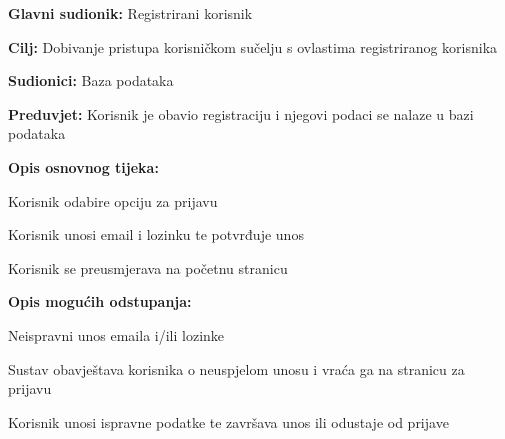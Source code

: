 \noindent {}
\begin{packed_item}

	\item \textbf{Glavni sudionik: }Registrirani korisnik
	\item  \textbf{Cilj:} Dobivanje pristupa korisničkom sučelju s ovlastima registriranog korisnika
	\item  \textbf{Sudionici:} Baza podataka
	\item  \textbf{Preduvjet:} Korisnik je obavio registraciju i njegovi podaci se nalaze u bazi podataka
	\item  \textbf{Opis osnovnog tijeka:}

	\item[] \begin{packed_enum}

		\item Korisnik odabire opciju za prijavu
		\item Korisnik unosi email i lozinku te potvrđuje unos
		\item Korisnik se preusmjerava na početnu stranicu
	\end{packed_enum}

	\item  \textbf{Opis mogućih odstupanja:}

	\item[] \begin{packed_item}

		\item[2.a] Neispravni unos emaila i/ili lozinke
		\item[] \begin{packed_enum}

			\item Sustav obavještava korisnika o neuspjelom unosu i vraća ga na stranicu za prijavu
			\item Korisnik unosi ispravne podatke te završava unos ili odustaje od prijave

		\end{packed_enum}
	\end{packed_item}
\end{packed_item}


